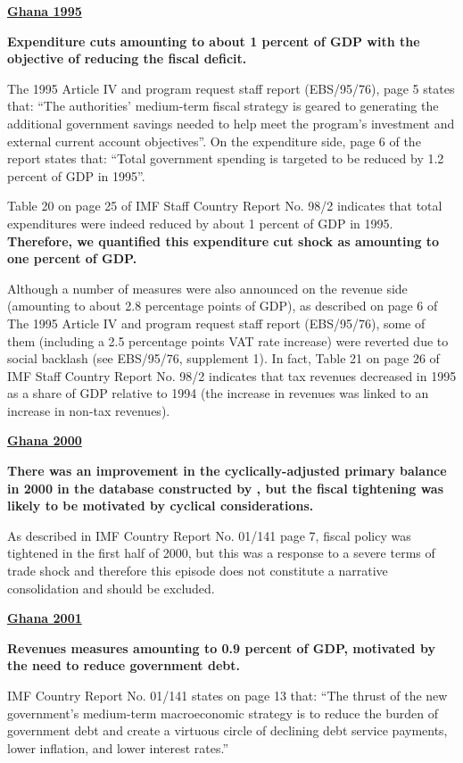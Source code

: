 \textbf{\underline{Ghana 1995}}

\textbf{Expenditure cuts amounting to about 1 percent of GDP with the objective of reducing the fiscal deficit.} 

The 1995 Article IV and program request staff report (EBS/95/76), page 5 states that: “The authorities' medium-term fiscal strategy is geared to generating the additional government savings needed to help meet the program's investment and external current account objectives”. On the expenditure side, page 6 of the report states that: “Total government spending is targeted to be reduced by 1.2 percent of GDP in 1995”.

Table 20 on page 25 of IMF Staff Country Report No. 98/2 indicates that total expenditures were indeed reduced by about 1 percent of GDP in 1995. \textbf{Therefore, we quantified this expenditure cut shock as amounting to one percent of GDP.}

Although a number of measures were also announced on the revenue side (amounting to about 2.8 percentage points of GDP), as described on page 6 of The 1995 Article IV and program request staff report (EBS/95/76), some of them (including a 2.5 percentage points VAT rate increase) were reverted due to social backlash (see EBS/95/76, supplement 1). In fact, Table 21 on page 26 of IMF Staff Country Report No. 98/2 indicates that tax revenues decreased in 1995 as a share of GDP relative to 1994 (the increase in revenues was linked to an increase in non-tax revenues).

\textbf{\underline{Ghana 2000}}

\textbf{There was an improvement in the cyclically-adjusted primary balance in 2000 in the database constructed by \cite{Davidetal.2023}, but the fiscal tightening was likely to be motivated by cyclical considerations.}

As described in IMF Country Report No. 01/141 page 7, fiscal policy was tightened in the first half of 2000, but this was a response to a severe terms of trade shock and therefore this episode does not constitute a narrative consolidation and should be excluded.

\textbf{\underline{Ghana 2001}}

\textbf{Revenues measures amounting to 0.9 percent of GDP, motivated by the need to reduce government debt.}

IMF Country Report No. 01/141 states on page 13 that: “The thrust of the new government's medium-term macroeconomic strategy is to reduce the burden of government debt and create a virtuous circle of declining debt service payments, lower inflation, and lower interest rates.”

